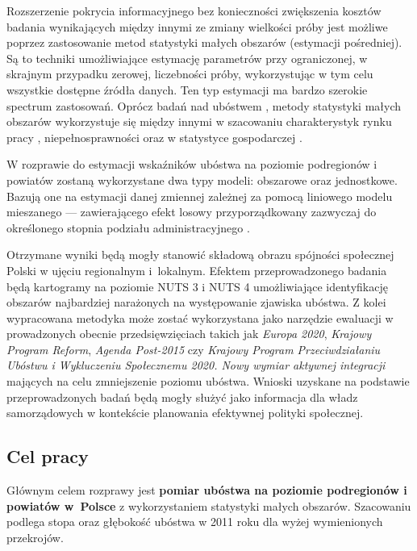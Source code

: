 Rozszerzenie pokrycia informacyjnego bez konieczności zwiększenia kosztów badania wynikających między innymi ze zmiany wielkości próby jest możliwe poprzez zastosowanie metod statystyki małych obszarów (estymacji pośredniej). Są to techniki umożliwiające estymację parametrów przy ograniczonej, w skrajnym przypadku zerowej, liczebności próby, wykorzystując w tym celu wszystkie dostępne źródła danych. Ten typ estymacji ma bardzo szerokie spectrum zastosowań. Oprócz badań nad ubóstwem \citep{ell2003,ebp2010,mq2006,esteban2012,pratesi2008}, metody statystyki małych obszarów wykorzystuje się między innymi w szacowaniu charakterystyk rynku pracy \citep{golata2004,wilak2014,molina2007}, niepełnosprawności \citep{elazar2004} oraz w statystyce gospodarczej \citep{dehnel2010,dehnel2017,chandra2012}.

W rozprawie do estymacji wskaźników ubóstwa na poziomie podregionów i powiatów zostaną wykorzystane dwa typy modeli: obszarowe oraz jednostkowe. Bazują one na estymacji danej zmiennej zależnej za pomocą liniowego modelu mieszanego --- zawierającego efekt losowy przyporządkowany zazwyczaj do określonego stopnia podziału administracyjnego \citep{rao2015}. 

Otrzymane wyniki będą mogły stanowić składową obrazu spójności społecznej Polski w ujęciu regionalnym i~lokalnym. Efektem przeprowadzonego badania będą kartogramy na poziomie NUTS 3 i NUTS 4 umożliwiające identyfikację obszarów najbardziej narażonych na występowanie zjawiska ubóstwa. Z kolei wypracowana metodyka może zostać wykorzystana jako narzędzie ewaluacji w prowadzonych obecnie przedsięwzięciach takich jak \textit{Europa 2020}, \textit{Krajowy Program Reform}, \textit{Agenda Post-2015} czy \textit{Krajowy Program Przeciwdziałaniu Ubóstwu i Wykluczeniu Społecznemu 2020. Nowy wymiar aktywnej integracji} mających na celu zmniejszenie poziomu ubóstwa. Wnioski uzyskane na podstawie przeprowadzonych badań będą mogły służyć jako informacja dla władz samorządowych w kontekście planowania efektywnej polityki społecznej.

\subsection*{Cel pracy}

Głównym celem rozprawy jest \textbf{pomiar ubóstwa na poziomie podregionów i powiatów w~Polsce} z wykorzystaniem statystyki małych obszarów. Szacowaniu podlega stopa oraz głębokość ubóstwa w 2011 roku dla wyżej wymienionych przekrojów. 

